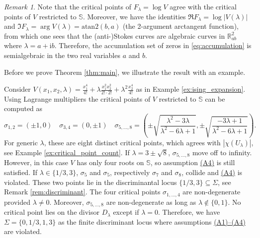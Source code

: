 \documentclass[11pt, a4paper]{article}
\numberwithin{theorem}{section}
\theoremstyle{remark}
\newtheorem{remark}[theorem]{Remark}
\newenvironment{example}
{\pushQED{\qed}\renewcommand{\qedsymbol}{$\diamond$}\examplex}
{\popQED\endexamplex}
\newcommand{\RR}{\mathbb{R}}
\renewcommand{\Re}{\mathfrak{R}}
\renewcommand{\Im}{\mathfrak{I}}
\newcommand{\Sc}{\mathbb{S}}
\theoremstyle{theorem}
\begin{document}
\begin{remark}
  Note that the critical points of $F_\lambda = \log V$ agree with the critical points of $V$ restricted to $\Sc$. Moreover, we have the identities $\Re F_\lambda = \log |V(\lambda)|$ and $\Im F_\lambda = \arg V(\lambda) = \mathrm{atan}2(b,a)$ (the 2-argument arctangent function), from which one sees that the (anti-)Stokes curves are algebraic curves in $\RR^2_{ab}$ where $\lambda = a + \mathrm{i} b$. Therefore, the accumulation set of zeros in \eqref{eq:accumulation} is semialgebraic in the two real variables $a$ and $b$.
\end{remark}

Before we prove Theorem \ref{thm:main}, we illustrate the result with an example.

\begin{example}
  \label{ex:big_illustration}
  Consider $V(x_1,x_2,\lambda) = \frac{x_1^4}{4!} + \lambda \frac{x_1^2x_2^2}{2!\cdot 2!} + \lambda^2 \frac{x_2^4}{4!}$ as in Example \ref{ex:ising_expansion}. Using Lagrange multipliers the critical points of $V$ restricted to $\Sc$ can be computed as
  \begin{equation*}
    \label{eq:critical_points}
      \sigma_{1,2} = (\pm 1, 0) \quad \sigma_{3,4} = (0, \pm 1) \quad \sigma_{5,\dots,8} = \left( \pm \sqrt{\frac{\lambda^2 - 3\lambda}{\lambda^2 - 6\lambda + 1}}, \pm \sqrt{\frac{-3\lambda + 1}{\lambda^2 - 6\lambda + 1}} \right).
  \end{equation*}
  For generic $\lambda$, these are eight distinct critical points, which agrees with $|\chi(U_\lambda)|$, see Example \ref{ex:critical_point_count}. If $\lambda = 3\pm\sqrt{8}$, $\sigma_{5,\dots,8}$ move off to infinity. 
  However, in this case $V$ has only four roots on $\Sc$, so assumption \hyperref[ass:A4]{(A4)} is still satisfied. If $\lambda\in \{1/3, 3\}$, $\sigma_5$ and $\sigma_5$, respectively $\sigma_7$ and $\sigma_8$, collide and \hyperref[ass:A4]{(A4)} is violated. 
  These two points lie in the discriminantal locus $\{1/3, 3\} \subseteq \Sigma$, see Remark \ref{rem:discriminant}. The four critical points $\sigma_{1,\dots,4}$ are non-degenerate provided $\lambda\neq 0$. Moreover, $\sigma_{5,\dots,8}$ are non-degenerate as long as $\lambda\notin\{0,1\}$. No critical point lies on the divisor $D_\lambda$ except if $\lambda=0$. Therefore, we have $\Sigma = \{0,1/3,1,3\}$ as the finite discriminant locus where assumptions \hyperref[ass:A1]{(A1)--(A4)} are violated.\par


\end{example}
\end{document}
